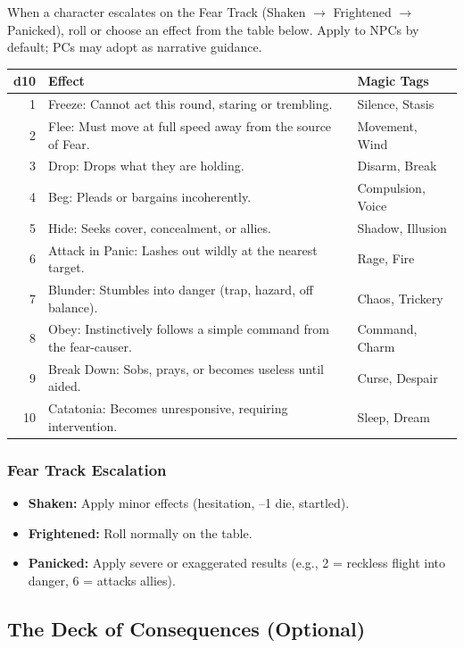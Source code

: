 When a character escalates on the Fear Track (Shaken $\rightarrow$ Frightened $\rightarrow$ Panicked), roll or choose an effect from the table below. Apply to NPCs by default; PCs may adopt as narrative guidance.

\begin{tabular}{@{}rll@{}}
\toprule
\textbf{d10} & \textbf{Effect} & \textbf{Magic Tags} \\
\midrule
1 & Freeze: Cannot act this round, staring or trembling. & Silence, Stasis \\
2 & Flee: Must move at full speed away from the source of Fear. & Movement, Wind \\
3 & Drop: Drops what they are holding. & Disarm, Break \\
4 & Beg: Pleads or bargains incoherently. & Compulsion, Voice \\
5 & Hide: Seeks cover, concealment, or allies. & Shadow, Illusion \\
6 & Attack in Panic: Lashes out wildly at the nearest target. & Rage, Fire \\
7 & Blunder: Stumbles into danger (trap, hazard, off balance). & Chaos, Trickery \\
8 & Obey: Instinctively follows a simple command from the fear-causer. & Command, Charm \\
9 & Break Down: Sobs, prays, or becomes useless until aided. & Curse, Despair \\
10 & Catatonia: Becomes unresponsive, requiring intervention. & Sleep, Dream \\
\bottomrule
\end{tabular}

\subsubsection{Fear Track Escalation}
\begin{itemize}
  \item \textbf{Shaken:} Apply minor effects (hesitation, –1 die, startled).
  \item \textbf{Frightened:} Roll normally on the table.
  \item \textbf{Panicked:} Apply severe or exaggerated results (e.g., 2 = reckless flight into danger, 6 = attacks allies).
\end{itemize}

\subsection{The Deck of Consequences (Optional)}

